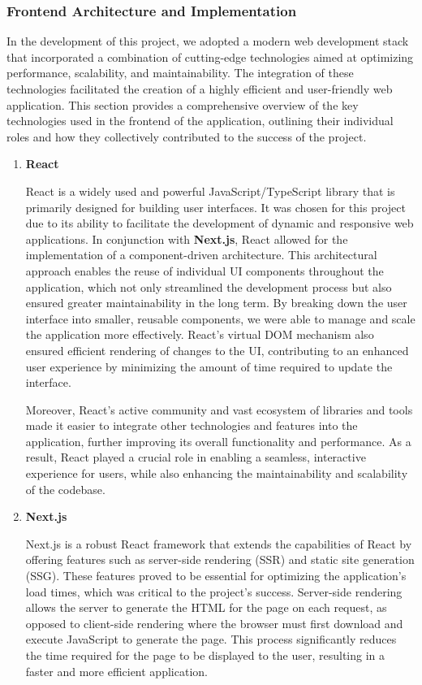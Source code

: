 \subsubsection{Frontend Architecture and Implementation}
In the development of this project, we adopted a modern web development stack that incorporated a combination of cutting{-}edge technologies aimed at optimizing performance, scalability, and maintainability. The integration of these technologies facilitated the creation of a highly efficient and user{-}friendly web application. This section provides a comprehensive overview of the key technologies used in the frontend of the application, outlining their individual roles and how they collectively contributed to the success of the project.
\begin{enumerate}
    \item{} \textbf{React}

     React is a widely used and powerful JavaScript/TypeScript library that is primarily designed for building user interfaces. It was chosen for this project due to its ability to facilitate the development of dynamic and responsive web applications. In conjunction with \textbf{Next.js}, React allowed for the implementation of a component{-}driven architecture. This architectural approach enables the reuse of individual UI components throughout the application, which not only streamlined the development process but also ensured greater maintainability in the long term. By breaking down the user interface into smaller, reusable components, we were able to manage and scale the application more effectively. React’s virtual DOM mechanism also ensured efficient rendering of changes to the UI, contributing to an enhanced user experience by minimizing the amount of time required to update the interface.
     
    Moreover, React’s active community and vast ecosystem of libraries and tools made it easier to integrate other technologies and features into the application, further improving its overall functionality and performance. As a result, React played a crucial role in enabling a seamless, interactive experience for users, while also enhancing the maintainability and scalability of the codebase.

    \item{} \textbf{Next.js}
    
    Next.js is a robust React framework that extends the capabilities of React by offering features such as server{-}side rendering (SSR) and static site generation (SSG). These features proved to be essential for optimizing the application's load times, which was critical to the project’s success. Server{-}side rendering allows the server to generate the HTML for the page on each request, as opposed to client{-}side rendering where the browser must first download and execute JavaScript to generate the page. This process significantly reduces the time required for the page to be displayed to the user, resulting in a faster and more efficient application.


\end{enumerate}
